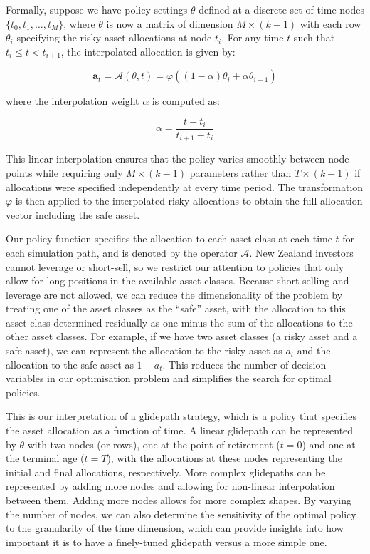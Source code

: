 \documentclass[11pt]{article}
\begin{document}
Formally, suppose we have policy settings \(\theta\) defined at a discrete set of time nodes \(\{t_0, t_1, \ldots, t_M\}\), where \(\theta\) is now a matrix of dimension \(M \times (k-1)\) with each row \(\theta_i\) specifying the risky asset allocations at node \(t_i\). For any time \(t\) such that \(t_i \leq t < t_{i+1}\), the interpolated allocation is given by:

\begin{equation}\label{interpolated_allocation}
  \mathbf{a}_t = \mathcal{A}(\theta, t) = \varphi\left((1-\alpha)\theta_i + \alpha\theta_{i+1}\right)
\end{equation}

where the interpolation weight \(\alpha\) is computed as:

\begin{equation}\label{interpolation_weight}
  \alpha = \frac{t - t_i}{t_{i+1} - t_i}
\end{equation}

This linear interpolation ensures that the policy varies smoothly between node points while requiring only \(M \times (k-1)\) parameters rather than \(T \times (k-1)\) if allocations were specified independently at every time period. The transformation \(\varphi\) is then applied to the interpolated risky allocations to obtain the full allocation vector including the safe asset.


Our policy function specifies the allocation to each asset class at each time \(t\) for each simulation path, and is denoted by the operator \(\mathcal{A}\). New Zealand investors cannot leverage or short-sell, so we restrict our attention to policies that only allow for long positions in the available asset classes. Because short-selling and leverage are not allowed, we can reduce the dimensionality of the problem by treating one of the asset classes as the ``safe'' asset, with the allocation to this asset class determined residually as one minus the sum of the allocations to the other asset classes. For example, if we have two asset classes (a risky asset and a safe asset), we can represent the allocation to the risky asset as \(a_t\) and the allocation to the safe asset as \(1 - a_t\). This reduces the number of decision variables in our optimisation problem and simplifies the search for optimal policies.

This is our interpretation of a glidepath strategy, which is a policy that specifies the asset allocation as a function of time. A linear glidepath can be represented by \(\theta\) with two nodes (or rows), one at the point of retirement (\(t=0\)) and one at the terminal age (\(t=T\)), with the allocations at these nodes representing the initial and final allocations, respectively. More complex glidepaths can be represented by adding more nodes and allowing for non-linear interpolation between them. Adding more nodes allows for more complex shapes. By varying the number of nodes, we can also determine the sensitivity of the optimal policy to the granularity of the time dimension, which can provide insights into how important it is to have a finely-tuned glidepath versus a more simple one.
\end{document}
